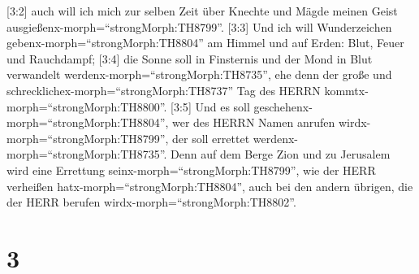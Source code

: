  {[}3:2{]} auch will ich mich zur selben Zeit über Knechte
und Mägde meinen Geist ausgießenx-morph=``strongMorph:TH8799''.
 {[}3:3{]} Und ich will Wunderzeichen
gebenx-morph=``strongMorph:TH8804'' am Himmel und auf Erden: Blut, Feuer
und Rauchdampf;  {[}3:4{]} die Sonne soll in Finsternis und
der Mond in Blut verwandelt werdenx-morph=``strongMorph:TH8735'', ehe
denn der große und schrecklichex-morph=``strongMorph:TH8737'' Tag des
HERRN kommtx-morph=``strongMorph:TH8800''.  {[}3:5{]} Und
es soll geschehenx-morph=``strongMorph:TH8804'', wer des HERRN Namen
anrufen wirdx-morph=``strongMorph:TH8799'', der soll errettet
werdenx-morph=``strongMorph:TH8735''. Denn auf dem Berge Zion und zu
Jerusalem wird eine Errettung seinx-morph=``strongMorph:TH8799'', wie
der HERR verheißen hatx-morph=``strongMorph:TH8804'', auch bei den
andern übrigen, die der HERR berufen wirdx-morph=``strongMorph:TH8802''.

\hypertarget{section-2}{%
\section{3}\label{section-2}}

